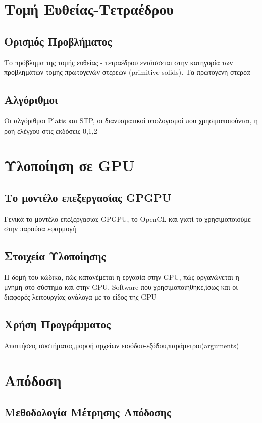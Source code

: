 \documentclass[a4paper,oneside,titlepage,12pt]{article}
\begin{document}
 
\section{Τομή Ευθείας-Τετραέδρου}
\subsection{Ορισμός Προβλήματος}

Το πρόβλημα της τομής ευθείας - τετραέδρου εντάσσεται στην κατηγορία των προβλημάτων τομής πρωτογενών στερεών (primitive solids).
Τα πρωτογενή στερεά

\subsection{Αλγόριθμοι}

Οι αλγόριθμοι Platis και STP, οι διανυσματικοί υπολογισμοί που χρησιμοποιούνται, η ροή ελέγχου στις εκδόσεις 0,1,2

\section{Υλοποίηση σε GPU}
\subsection{Το μοντέλο επεξεργασίας GPGPU}

Γενικά το μοντέλο επεξεργασίας GPGPU, το OpenCL και γιατί το χρησιμοποιούμε στην παρούσα εφαρμογή

\subsection{Στοιχεία Υλοποίησης}

Η δομή του κώδικα, πώς κατανέμεται η εργασία στην GPU, πώς οργανώνεται η μνήμη στο σύστημα και στην GPU, Software που χρησιμοποιήθηκε,ίσως και οι διαφορές λειτουργίας ανάλογα με το είδος της GPU

\subsection{Χρήση Προγράμματος}

Απαιτήσεις συστήματος,μορφή αρχείων εισόδου-εξόδου,παράμετροι(arguments)

\section{Απόδοση}
\subsection{Μεθοδολογία Μέτρησης Απόδοσης}
\end{document}
